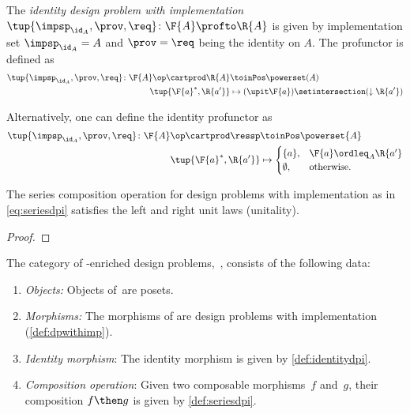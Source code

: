 {    \begin{definition}
        \label{def:identitydpi}
        The \emph{identity design problem with implementation}~$\tup{\impsp_{\id_A},\prov,\req} \colon \F{A} \profto \R{A}$ is given by implementation set $\impsp_{\id_A} = A$ and $\prov=\req$ being the identity on $A$.
        The profunctor is defined as
        \begin{align}
            \tup{\impsp_{\id_A},\prov,\req} \colon \F{A}\op \cartprod \R{A} & \toinPos \powerset(A) \\
            \tup{\F{a}^*,\R{a'}}                                            & \mapsto (\upit \F{a}) \setintersection (\downarrow \R{a'})
        \end{align}
    \end{definition}
    \begin{remark}
        Alternatively, one can define the identity profunctor as
        \begin{align}
            \tup{\impsp_{\id_A},\prov,\req}\colon \F{A}\op \cartprod \ressp & \toinPos \powerset{A} \\
            \tup{\F{a}^*,\R{a'}}                                            & \mapsto
            \begin{cases}
                \{a\},     & \F{a}\ordleq_A \R{a'} \\
                \emptyset, & \text{otherwise}.
            \end{cases}
        \end{align}
    \end{remark}

    \begin{lemma}
        The series composition operation for design problems with implementation as in \cref{eq:seriesdpi} satisfies the left and right unit laws (unitality).
    \end{lemma}

    \begin{proof}
    \end{proof}

    \begin{definition}
        The category of \Set-enriched design problems,~\DPI, consists of the following data:
        \begin{enumerate}
            \item \emph{Objects:}
                  Objects of~\DPI are posets.
            \item \emph{Morphisms:}
                  The morphisms of \DPI are design problems with implementation (\cref{def:dpwithimp}).
            \item \emph{Identity morphism}: The identity morphism is given by \cref{def:identitydpi}.
            \item \emph{Composition operation}: Given two composable morphisms~$f$ and~$g$, their composition $f\then g$ is given by \cref{def:seriesdpi}.
        \end{enumerate}
    \end{definition}

}
